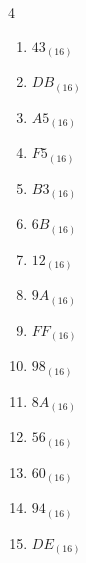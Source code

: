 \begin{multicols}{4}
\begin{enumerate}
  \item $43_{(16)}$

        \phantom{$=67$}

  \item $DB_{(16)}$

        \phantom{$=219$}

  \item $A5_{(16)}$

        \phantom{$=165$}

  \item $F5_{(16)}$

        \phantom{$=245$}

  \item $B3_{(16)}$

        \phantom{$=179$}

  \item $6B_{(16)}$

        \phantom{$=107$}

  \item $12_{(16)}$

        \phantom{$=18$}

  \item $9A_{(16)}$

        \phantom{$=154$}

  \item $FF_{(16)}$

        \phantom{$=255$}

  \item $98_{(16)}$

        \phantom{$=152$}

  \item $8A_{(16)}$

        \phantom{$=138$}

  \item $56_{(16)}$

        \phantom{$=86$}

  \item $60_{(16)}$

        \phantom{$=96$}

  \item $94_{(16)}$

        \phantom{$=148$}

  \item $DE_{(16)}$

        \phantom{$=222$}

\columnbreak %

\resetques


\end{enumerate}
\end{multicols}
